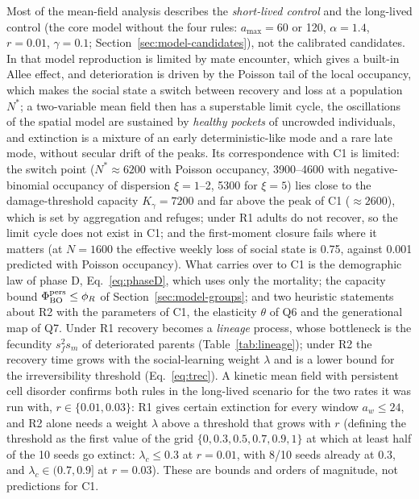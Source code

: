 Most of the mean-field analysis describes the \emph{short-lived control} and the long-lived control (the core
model without the four rules: $a_{\max}=60$ or 120, $\alpha=1.4$, $r=0.01$, $\gamma=0.1$;
Section~\ref{sec:model-candidates}), not the calibrated candidates. In that model
reproduction is limited by mate encounter, which gives a built-in Allee effect, and deterioration is driven by the
Poisson tail of the local occupancy, which makes the social state a switch between recovery and loss at a
population $N^*$; a two-variable mean field then has a superstable limit cycle, the oscillations of the spatial
model are sustained by \emph{healthy pockets} of uncrowded individuals, and extinction is a mixture of an early
deterministic-like mode and a rare late mode, without secular drift of the peaks. Its correspondence with
\textsf{C1} is limited: the switch point ($N^*\approx6200$ with Poisson occupancy, 3900--4600 with negative-binomial
occupancy of dispersion $\xi=1$--2, 5300 for $\xi=5$) lies close to the damage-threshold capacity $K_\gamma=7200$ and
far above the peak of \textsf{C1}
($\approx2600$), which is set by aggregation and refuges; under R1 adults do not recover, so the limit cycle does not
exist in \textsf{C1}; and the first-moment closure fails where it matters (at $N=1600$ the effective weekly loss of
social state is 0.75, against 0.001 predicted with Poisson occupancy). What carries over to \textsf{C1} is the demographic law of phase D, Eq.~\eqref{eq:phaseD}, which uses only the
mortality; the capacity bound $\Phi_{\rm BO}^{\rm pers}\le\phi_R$ of Section~\ref{sec:model-groups}; and two
heuristic statements about R2 with the parameters of \textsf{C1}, the elasticity $\theta$ of Q6 and the
generational map of Q7. Under R1 recovery becomes a \emph{lineage} process, whose bottleneck is the fecundity
$s_f^2s_m$ of deteriorated parents (Table~\ref{tab:lineage}); under R2 the recovery time grows with the
social-learning weight $\lambda$ and is a lower bound for the irreversibility threshold (Eq.~\eqref{eq:trec}). A
kinetic mean field with persistent cell disorder confirms both rules in the long-lived scenario for the two rates
it was run with, $r\in\{0.01,0.03\}$: R1 gives certain extinction for every window $a_w\le24$, and R2 alone needs a
weight $\lambda$ above a threshold that grows with $r$ (defining the threshold as the first value of the grid
$\{0,0.3,0.5,0.7,0.9,1\}$ at which at least half of the 10 seeds go extinct: $\lambda_c\le0.3$ at $r=0.01$, with
8/10 seeds already at 0.3, and $\lambda_c\in(0.7,0.9]$ at $r=0.03$). These are bounds and orders of magnitude, not
predictions for \textsf{C1}.

